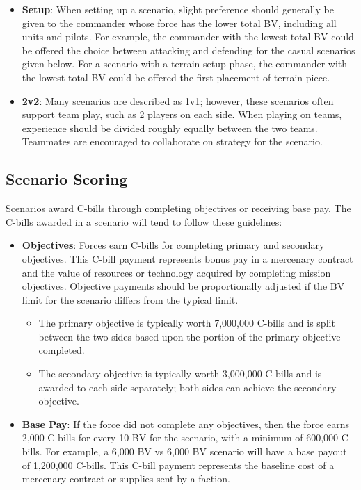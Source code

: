 \documentclass{article}
\begin{document}
\begin{itemize}

\item {\bfseries Setup}: When setting up a scenario, slight preference should generally be given to the commander whose force has the lower total BV, including all units and pilots.
For example, the commander with the lowest total BV could be offered the choice between attacking and defending for the casual scenarios given below.
For a scenario with a terrain setup phase, the commander with the lowest total BV could be offered the first placement of terrain piece.

\item {\bfseries 2v2}: Many scenarios are described as 1v1; however, these scenarios often support team play, such as 2 players on each side.
When playing on teams, experience should be divided roughly equally between the two teams.
Teammates are encouraged to collaborate on strategy for the scenario.

\end{itemize}

\subsection{Scenario Scoring}

Scenarios award C-bills through completing objectives or receiving base pay.
The C-bills awarded in a scenario will tend to follow these guidelines:

\begin{itemize}

\item {\bfseries Objectives}: Forces earn C-bills for completing primary and secondary objectives.
This C-bill payment represents bonus pay in a mercenary contract and the value of resources or technology acquired by completing mission objectives.
Objective payments should be proportionally adjusted if the BV limit for the scenario differs from the typical limit.

\begin{itemize}

\item The primary objective is typically worth 7,000,000 C-bills and is split between the two sides based upon the portion of the primary objective completed.

\item The secondary objective is typically worth 3,000,000 C-bills and is awarded to each side separately; both sides can achieve the secondary objective.

\end{itemize}

\item {\bfseries Base Pay}: If the force did not complete any objectives, then the force earns 2,000 C-bills for every 10 BV for the scenario, with a minimum of 600,000 C-bills.
For example, a 6,000 BV vs 6,000 BV scenario will have a base payout of 1,200,000 C-bills.
This C-bill payment represents the baseline cost of a mercenary contract or supplies sent by a faction.

\end{itemize}
\end{document}

